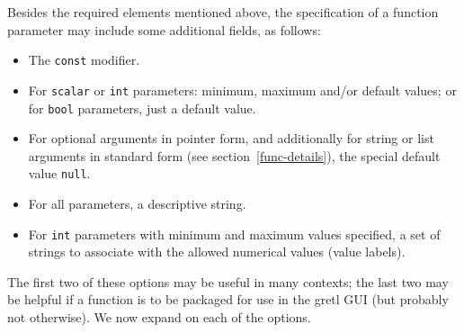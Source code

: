Besides the required elements mentioned above, the specification of a
function parameter may include some additional fields, as follows:
\begin{itemize}
\item The \texttt{const} modifier.
\item For \texttt{scalar} or \texttt{int} parameters: minimum, maximum
  and/or default values; or for \texttt{bool} parameters, just a
  default value.
\item For optional arguments in pointer form, and additionally for
  string or list arguments in standard form (see
  section~\ref{func-details}), the special default value
  \texttt{null}.
\item For all parameters, a descriptive string.
\item For \texttt{int} parameters with minimum and maximum values
  specified, a set of strings to associate with the allowed numerical
  values (value labels).
\end{itemize}

The first two of these options may be useful in many contexts; the
last two may be helpful if a function is to be packaged for use in
the gretl GUI (but probably not otherwise). We now expand on
each of the options.

